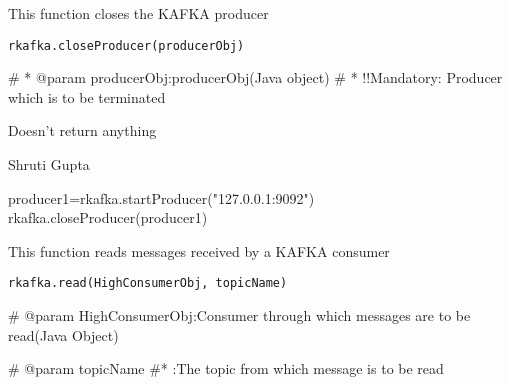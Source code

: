 \documentclass[letterpaper]{book}
\begin{document}
%
\begin{Description}\relax
This function closes the KAFKA producer
\end{Description}
%
\begin{Usage}
\begin{verbatim}
rkafka.closeProducer(producerObj)
\end{verbatim}
\end{Usage}
%
\begin{Arguments}
\begin{ldescription}
\item[\code{producerObj}] 
\#     * @param producerObj:producerObj(Java object)
\#   *            !!Mandatory: Producer which is to be terminated

\end{ldescription}
\end{Arguments}
%
\begin{Value}
Doesn't return anything
\end{Value}
%
\begin{Author}\relax
Shruti Gupta
\end{Author}
%
\begin{Examples}
\begin{ExampleCode}
producer1=rkafka.startProducer("127.0.0.1:9092")
rkafka.closeProducer(producer1)
\end{ExampleCode}
\end{Examples}
%
\begin{Description}\relax
This function reads messages received by a KAFKA consumer
\end{Description}
%
\begin{Usage}
\begin{verbatim}
rkafka.read(HighConsumerObj, topicName)
\end{verbatim}
\end{Usage}
%
\begin{Arguments}
\begin{ldescription}
\item[\code{HighConsumerObj}] 
\#  	  @param HighConsumerObj:Consumer through which messages are to be read(Java Object)	

\item[\code{topicName}] 
\#  	  @param topicName
\#*            :The topic from which message is to be read

\end{ldescription}
\end{Arguments}
\end{document}
